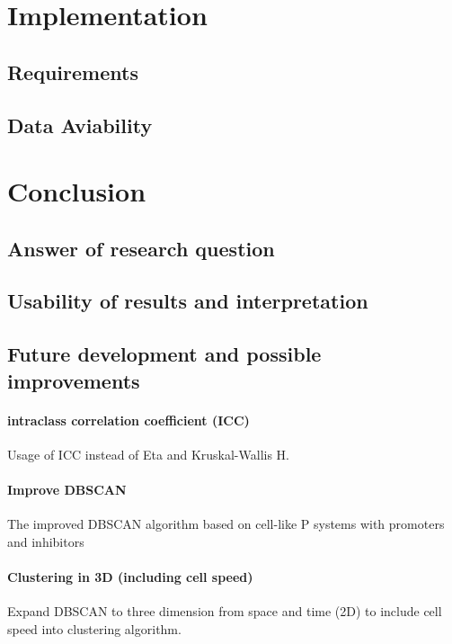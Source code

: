 \documentclass[a4paper,12pt]{report}
\begin{document}
\chapter{Implementation}

\section{Requirements}

\section{Data Aviability}

\chapter{Conclusion}

\section{Answer of research question}

\section{Usability of results and interpretation}

\section{Future development and possible improvements} 

\subsubsection{intraclass correlation coefficient (ICC)}
Usage of ICC instead of Eta and Kruskal-Wallis H.

\subsubsection{Improve DBSCAN}
The improved DBSCAN algorithm based on cell-like P systems with promoters and inhibitors

\subsubsection{Clustering in 3D (including cell speed)}
Expand DBSCAN to three dimension from space and time (2D) to include cell speed into clustering algorithm.
\end{document}
